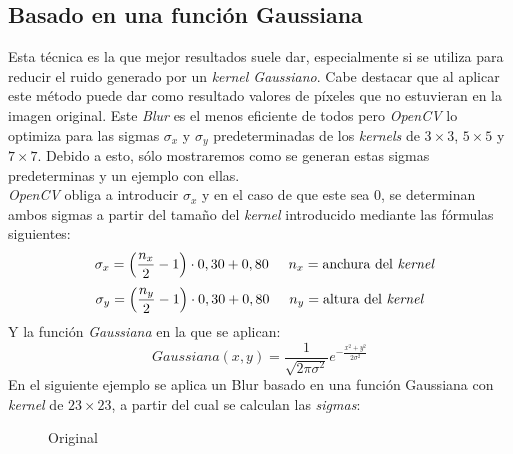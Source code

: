 \subsection{Basado en una función Gaussiana}
Esta técnica es la que mejor resultados suele dar, especialmente si se
utiliza para reducir el ruido generado por un \emph{kernel
  Gaussiano}. Cabe destacar que al aplicar este método puede dar como
resultado valores de píxeles que no estuvieran en la imagen
original. Este \emph{Blur} es el menos eficiente de todos pero
\emph{OpenCV} lo optimiza para las sigmas $\sigma_x$ y $\sigma_y$
predeterminadas de los \emph{kernels} de $3\times3$, $5\times5$ y
$7\times7$. Debido a esto, sólo mostraremos como se
generan estas sigmas predeterminas y un ejemplo con ellas.\\
\emph{OpenCV} obliga a introducir $\sigma_x$ y en el caso de que este sea
$0$, se determinan ambos sigmas a partir del tamaño del \emph{kernel}
introducido mediante las fórmulas siguientes:
\begin{equation*}
  \hspace{0.25cm}\sigma_x = \left(\frac{n_x}{2} - 1 \right) \cdot 0,30 + 0,80 \hspace{0.5cm} n_x = \text{anchura del \emph{kernel}}
\end{equation*}
\begin{equation*}
  \sigma_y = \left(\frac{n_y}{2} - 1 \right) \cdot 0,30 + 0,80 \hspace{0.5cm} n_y = \text{altura del \emph{kernel}}
\end{equation*}
Y la función \emph{Gaussiana} en la que se aplican:
\begin{equation*}
  Gaussiana(x, y) = \frac{1}{\sqrt{2 \pi \sigma^{2}}}e^{- \frac{x^{2}+y^{2}}{2\sigma^{2}}}
\end{equation*}
En el siguiente ejemplo se aplica un Blur basado en una función
Gaussiana con \emph{kernel} de $23 \times 23$, a partir del cual se
calculan las \emph{sigmas}:

\begin{figure}[H]
  \caption{Original}
  \centering \setlength\fboxsep{0pt} \setlength\fboxrule{0.5pt}
\end{figure}

